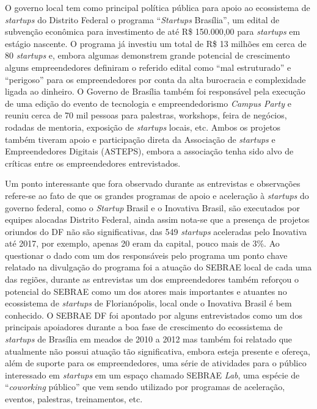 O governo local tem como principal política pública para apoio ao ecossistema de \textit{startups} do Distrito Federal o programa ``\textit{Startups} Brasília'', um edital de subvenção econômica para investimento de até R\$ 150.000,00 para \textit{startups} em estágio nascente. O programa já investiu um total de R\$ 13 milhões em cerca de 80 \textit{startups} e, embora algumas demonstrem grande potencial de crescimento alguns empreendedores definiram o referido edital como ``mal estruturado'' e ``perigoso'' para os empreendedores por conta da alta burocracia e complexidade ligada ao dinheiro. O Governo de Brasília também foi responsável pela execução de uma edição do evento de tecnologia e empreendedorismo \textit{Campus Party} e reuniu cerca de 70 mil pessoas para palestras, workshops, feira de negócios, rodadas de mentoria, exposição de \textit{startups} locais, etc. Ambos os projetos também tiveram apoio e participação direta da Associação de \textit{startups} e Empreendedores Digitais (ASTEPS), embora a associação tenha sido alvo de críticas entre os empreendedores entrevistados.

Um ponto interessante que fora observado durante as entrevistas e observações refere-se ao fato de que os grandes programas de apoio e aceleração à \textit{startups} do governo federal, como o \textit{Startup} Brasil e o Inovativa Brasil, são executados por equipes alocadas Distrito Federal, ainda assim nota-se que a presença de projetos oriundos do DF não são significativas, das 549 \textit{startups} aceleradas pelo Inovativa até 2017, por exemplo, apenas 20 eram da capital, pouco mais de 3\%. Ao questionar o dado com um dos responsáveis pelo programa um ponto chave relatado na divulgação do programa foi a atuação do SEBRAE local de cada uma das regiões, durante as entrevistas um dos empreendedores também reforçou o potencial do SEBRAE como um dos atores mais importantes e atuantes no ecossistema de \textit{startups} de Florianópolis, local onde o Inovativa Brasil é bem conhecido. O SEBRAE DF foi apontado por alguns entrevistados como um dos principais apoiadores durante a boa fase de crescimento do ecossistema de \textit{startups} de Brasília em meados de 2010 a 2012 mas também foi relatado que atualmente não possui atuação tão significativa, embora esteja presente e ofereça, além de suporte para os empreendedores, uma série de atividades para o público interessado em \textit{startups} em um espaço chamado SEBRAE \textit{Lab}, uma espécie de ``\textit{coworking} público'' que vem sendo utilizado por programas de aceleração, eventos, palestras, treinamentos, etc.

